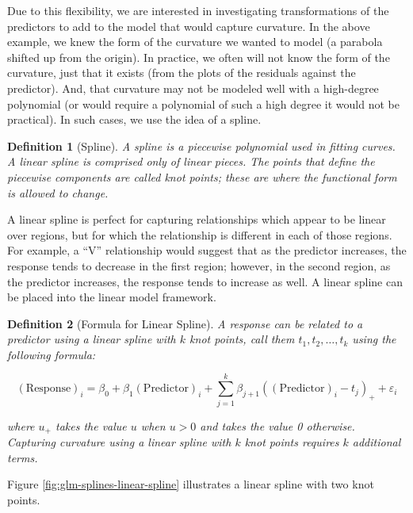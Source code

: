 \documentclass[
]{book}
\theoremstyle{plain}
\theoremstyle{mydefn}
\newtheorem{definition}{Definition}[chapter]
\theoremstyle{myexmpl}
\theoremstyle{remark}
\begin{document}
Due to this flexibility, we are interested in investigating transformations of the predictors to add to the model that would capture curvature. In the above example, we knew the form of the curvature we wanted to model (a parabola shifted up from the origin). In practice, we often will not know the form of the curvature, just that it exists (from the plots of the residuals against the predictor). And, that curvature may not be modeled well with a high-degree polynomial (or would require a polynomial of such a high degree it would not be practical). In such cases, we use the idea of a spline.

\begin{definition}[Spline]
\protect\hypertarget{def:defn-spline}{}{\label{def:defn-spline} {} }A spline is a piecewise polynomial used in fitting curves. A \emph{linear} spline is comprised only of linear pieces. The points that define the piecewise components are called \emph{knot points}; these are where the functional form is allowed to change.
\end{definition}

A linear spline is perfect for capturing relationships which appear to be linear over regions, but for which the relationship is different in each of those regions. For example, a ``V'' relationship would suggest that as the predictor increases, the response tends to decrease in the first region; however, in the second region, as the predictor increases, the response tends to increase as well. A linear spline can be placed into the linear model framework.

\begin{definition}[Formula for Linear Spline]
\protect\hypertarget{def:defn-linear-spline-formula}{}{\label{def:defn-linear-spline-formula} {} }A response can be related to a predictor using a linear spline with \(k\) knot points, call them \(t_1, t_2, \dotsc, t_k\) using the following formula:

\[(\text{Response})_i = \beta_0 + \beta_1 (\text{Predictor})_i + \sum_{j=1}^{k} \beta_{j+1} \left((\text{Predictor})_i - t_j\right)_{+} + \varepsilon_i\]

where \(u_{+}\) takes the value \(u\) when \(u > 0\) and takes the value 0 otherwise. Capturing curvature using a linear spline with \(k\) knot points requires \(k\) additional terms.
\end{definition}

Figure \ref{fig:glm-splines-linear-spline} illustrates a linear spline with two knot points.
\end{document}
